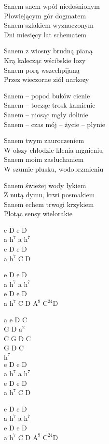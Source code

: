 \begin{textn}
    Sanem snem wpół niedośnionym\\
    Płowiejącym gór dogmatem\\
    Sanem szlakiem wyznaczonym\\
    Dni miesięcy lat schematem

    Sanem z wiosny brudną pianą\\
    Krą kalecząc wścibskie łozy\\
    Sanem porą wszechpijaną\\
    Przez wieczorne ziół narkozy


    \vin Sanem – popod buków cienie\\
    \vin Sanem – tocząc trosk kamienie\\
    \vin Sanem – niosąc mgły dolinie\\
    \vin Sanem – czas mój – życie – płynie

    Sanem twym zauroczeniem\\
    W olszy chłodzie klenia mgnieniu\\
    Sanem moim zasłuchaniem\\
    W szumie plusku, wodobrzmieniu

    Sanem świeżej wody łykiem\\
    Z nutą dymu, krwi posmakiem\\
    Sanem echem trwogi krzykiem\\
    Plotąc sensy wielorakie
\end{textn}
\begin{chordw}
    e D e D\\
    a $\mathrm{h^7}$ a $\mathrm{h^7}$\\
    e D e D\\
    a $\mathrm{h^7}$ C D

    e D e D\\
    a $\mathrm{h^7}$ a $\mathrm{h^7}$\\
    e D e D\\
    a $\mathrm{h^7}$ C D $\mathrm{A^{9}}$ $\mathrm{C^{24}}$D

    \hfill\break
    \hfill\break
    a e D C\\
    G D $\mathrm{a^2}$\\
    C G D C\\
    G D C\\
    $\mathrm{h^7}$\\
    e D e D\\
    a $\mathrm{h^7}$ a $\mathrm{h^7}$\\
    e D e D\\
    a $\mathrm{h^7}$ C D

    e D e D\\
    a $\mathrm{h^7}$ a $\mathrm{h^7}$\\
    e D e D\\
    a $\mathrm{h^7}$ C D $\mathrm{A^{9}}$ $\mathrm{C^{24}}$D
\end{chordw}
